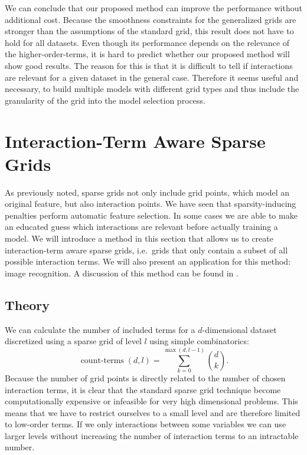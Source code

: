 We can conclude that our proposed method can improve the performance without additional cost.
Because the smoothness constraints for the generalized grids are stronger than the assumptions of the standard grid, this result does not have to hold for all datasets.
Even though its performance depends on the relevance of the higher-order-terms, it is hard to predict whether our proposed method will show good results.
The reason for this is that it is difficult to tell if interactions are relevant for a given dataset in the general case.
Therefore it seems useful and necessary, to build multiple models with different grid types and thus include the granularity of the grid into the model selection process.

\section{Interaction-Term Aware Sparse Grids}
As previously noted, sparse grids not only include grid points, which model an original feature, but
also interaction points.
We have seen that sparsity-inducing penalties perform automatic feature
selection.
In some cases we are able to make an educated guess which interactions are
relevant before actually training a model.
We will introduce a method in this section that allows us to create
interaction-term aware sparse grids, i.e.~grids that only contain a subset of
all possible interaction terms.
We will also present an application for this method: image recognition.
A discussion of this method can be found in \cite{sparse-parsimony}.

\subsection{Theory}
We can calculate the number of included terms for a \(d\)-dimensional dataset
discretized using a sparse grid of level \(l\) using simple combinatorics:
\begin{equation*}
  \operatorname{count-terms}(d, l) = \sum_{k  = 0}^{\max (d, l-1)} \binom{d}{k}.
\end{equation*}
Because the number of grid points is directly related to the number of chosen
interaction terms, it is clear that the standard sparse grid technique become
computationally expensive or infeasible for very high dimensional problems.
This means that we have to restrict ourselves to a small level and are therefore
limited to low-order terms.
If we only interactions between some variables we can use larger levels without increasing the number of interaction terms to an intractable number.

